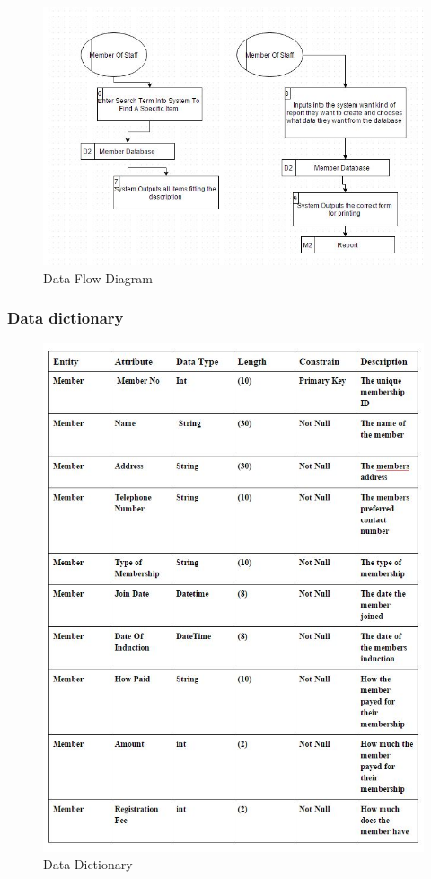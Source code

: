 \begin{figure}[H]
    \includegraphics[width=\textwidth]{dfd_2.JPG}
    \caption{Data Flow Diagram} \label{fig: Data Flow Diagram }
\end{figure}

\subsubsection{Data dictionary}

\begin{figure}[H]
    \includegraphics[width=\textwidth]{DataDictionaryProposed.JPG}
    \caption{Data Dictionary} \label{fig: Data Destinations and Sources }
\end{figure}

